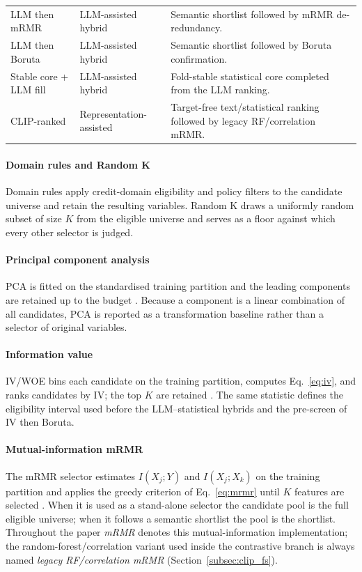 \documentclass[preprint,12pt]{elsarticle}
\newcommand{\Kfeat}{K}
\begin{document}
\begin{table}[htbp]
\begin{threeparttable}
\begin{tabular}{@{}llL{58mm}@{}}
LLM then mRMR & LLM-assisted hybrid & Semantic shortlist followed by mRMR de-redundancy. \\
LLM then Boruta & LLM-assisted hybrid & Semantic shortlist followed by Boruta confirmation. \\
Stable core + LLM fill & LLM-assisted hybrid & Fold-stable statistical core completed from the LLM ranking. \\
CLIP-ranked & Representation-assisted & Target-free text/statistical ranking followed by legacy RF/correlation mRMR. \\
\bottomrule
\end{tabular}
\end{threeparttable}
\end{table}

\paragraph{Domain rules and Random K}
Domain rules apply credit-domain eligibility and policy filters to the candidate universe and retain the resulting variables. Random K draws a uniformly random subset of size $\Kfeat$ from the eligible universe and serves as a floor against which every other selector is judged.

\paragraph{Principal component analysis}
PCA is fitted on the standardised training partition and the leading components are retained up to the budget \cite{jolliffe2016}. Because a component is a linear combination of all candidates, PCA is reported as a transformation baseline rather than a selector of original variables.

\paragraph{Information value}
IV/WOE bins each candidate on the training partition, computes Eq.~\eqref{eq:iv}, and ranks candidates by IV; the top $\Kfeat$ are retained \cite{siddiqi2006}. The same statistic defines the eligibility interval used before the LLM--statistical hybrids and the pre-screen of IV then Boruta.

\paragraph{Mutual-information mRMR}
The mRMR selector estimates $I(X_j;Y)$ and $I(X_j;X_k)$ on the training partition and applies the greedy criterion of Eq.~\eqref{eq:mrmr} until $\Kfeat$ features are selected \cite{peng2005,kraskov2004,ross2014}. When it is used as a stand-alone selector the candidate pool is the full eligible universe; when it follows a semantic shortlist the pool is the shortlist. Throughout the paper \emph{mRMR} denotes this mutual-information implementation; the random-forest/correlation variant used inside the contrastive branch is always named \emph{legacy RF/correlation mRMR} (Section~\ref{subsec:clip_fs}).
\end{document}
